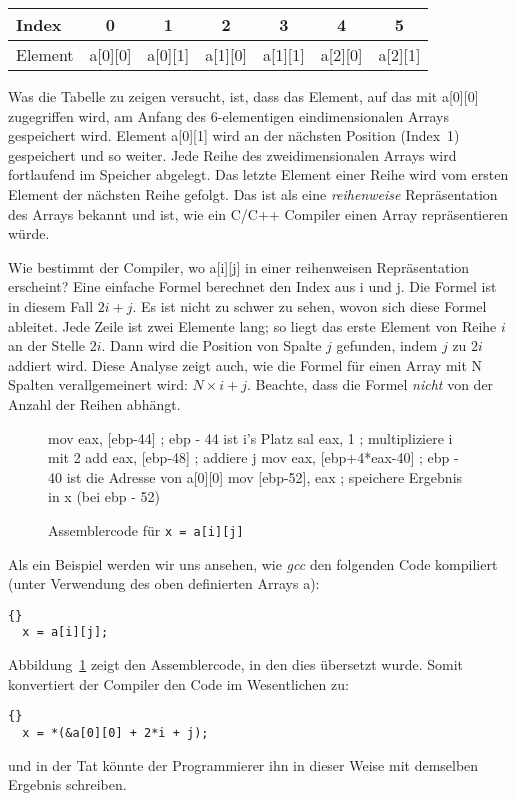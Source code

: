 \parbox{\textwidth}{
\vspace{0.5em}
\centering
\begin{tabular}{||l|c|c|c|c|c|c||}
 \hline
 Index   &    0    &    1    &    2    &    3    &    4    &    5    \\
 \hline
 Element & a[0][0] & a[0][1] & a[1][0] & a[1][1] & a[2][0] & a[2][1] \\
 \hline
\end{tabular}
\vspace{0.5em} } \noindent Was die Tabelle zu zeigen versucht, ist,
dass das Element, auf das mit {\code a[0][0]} zugegriffen wird, am
Anfang des 6-elementigen eindimensionalen Arrays gespeichert wird.
Element {\code a[0][1]} wird an der n\"{a}chsten Position (Index~1)
gespeichert und so weiter. Jede Reihe des zweidimensionalen Arrays
wird fortlaufend im Speicher abgelegt. Das letzte Element einer
Reihe wird vom ersten Element der n\"{a}chsten Reihe gefolgt. Das ist
als eine \emph{reihenweise} Repr\"{a}sentation des Arrays bekannt und
ist, wie ein C/C++ Compiler einen Array repr\"{a}sentieren w\"{u}rde.

Wie bestimmt der Compiler, wo {\code a[i][j]} in einer reihenweisen
Repr\"{a}sentation erscheint? Eine einfache Formel berechnet den Index
aus {\code i} und {\code j}. Die Formel ist in diesem Fall $2i + j$.
Es ist nicht zu schwer zu sehen, wovon sich diese Formel ableitet.
Jede Zeile ist zwei Elemente lang; so liegt das erste Element von
Reihe $i$ an der Stelle $2i$. Dann wird die Position von Spalte $j$
gefunden, indem $j$ zu $2i$ addiert wird. Diese Analyse zeigt auch,
wie die Formel f\"{u}r einen Array mit {\code N} Spalten verallgemeinert
wird: $N \times i + j$. Beachte, dass die Formel \emph{nicht} von
der Anzahl der Reihen abh\"{a}ngt.

\begin{figure}[ht]
\begin{AsmCodeListing}[numbers=left]
     mov    eax, [ebp-44]       ; ebp - 44 ist i's Platz
     sal    eax, 1              ; multipliziere i mit 2
     add    eax, [ebp-48]       ; addiere j
     mov    eax, [ebp+4*eax-40] ; ebp - 40 ist die Adresse von a[0][0]
     mov    [ebp-52], eax       ; speichere Ergebnis in x (bei ebp - 52)
\end{AsmCodeListing}
\caption{ Assemblercode f\"{u}r \lstinline|x = a[i][j]| \label{fig:aij}}
\end{figure}

Als ein Beispiel werden wir uns ansehen, wie \emph{gcc}
 den folgenden Code kompiliert (unter Verwendung
des oben definierten Arrays {\code a}):
\begin{lstlisting}[stepnumber=0]{}
  x = a[i][j];
\end{lstlisting}
Abbildung~\ref{fig:aij} zeigt den Assemblercode, in den dies
\"{u}bersetzt wurde. Somit konvertiert der Compiler den Code im
Wesentlichen zu:
\begin{lstlisting}[stepnumber=0]{}
  x = *(&a[0][0] + 2*i + j);
\end{lstlisting}
und in der Tat k\"{o}nnte der Programmierer ihn in dieser Weise mit
demselben Ergebnis schreiben.

